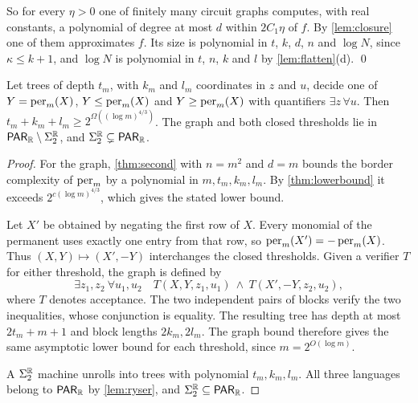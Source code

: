So for every $\eta>0$ one of finitely many circuit graphs computes, with real constants, a polynomial of degree at most $d$ within $2C_1\eta$ of $f$. By \cref{lem:closure} one of them approximates $f$. Its size is polynomial in $t$, $k$, $d$, $n$ and $\log N$, since $\kappa\le k+1$, and $\log N$ is polynomial in $t$, $n$, $k$ and $l$ by \cref{lem:flatten}(d). \qed

\begin{corollary}\label{cor:second}
Let trees of depth $t_m$, with $k_m$ and $l_m$ coordinates in $z$ and $u$, decide one of $Y=\operatorname{per}_m(X)$, $Y\le\operatorname{per}_m(X)$ and $Y\ge\operatorname{per}_m(X)$ with quantifiers $\exists z\,\forall u$. Then $t_m+k_m+l_m\ge2^{\Omega((\log m)^{4/3})}$. The graph and both closed thresholds lie in $\textsf{\upshape PAR}_{\mathbb{R}}\setminus\Sigma_2^{\mathbb{R}}$, and $\Sigma_2^{\mathbb{R}}\subsetneq\textsf{\upshape PAR}_{\mathbb{R}}$.
\end{corollary}

\begin{proof}
For the graph, \cref{thm:second} with $n=m^2$ and $d=m$ bounds the border complexity of $\operatorname{per}_m$ by a polynomial in $m,t_m,k_m,l_m$. By \cref{thm:lowerbound} it exceeds $2^{c(\log m)^{4/3}}$, which gives the stated lower bound.

Let $X'$ be obtained by negating the first row of $X$. Every monomial of the permanent uses exactly one entry from that row, so $\operatorname{per}_m(X')=-\operatorname{per}_m(X)$. Thus $(X,Y)\mapsto(X',-Y)$ interchanges the closed thresholds. Given a verifier $T$ for either threshold, the graph is defined by
\[
\exists z_1,z_2\ \forall u_1,u_2\quad
  T(X,Y,z_1,u_1)\ \land\ T(X',-Y,z_2,u_2),
\]
where $T$ denotes acceptance. The two independent pairs of blocks verify the two inequalities, whose conjunction is equality. The resulting tree has depth at most $2t_m+m+1$ and block lengths $2k_m,2l_m$. The graph bound therefore gives the same asymptotic lower bound for each threshold, since $m=2^{O(\log m)}$.

A $\Sigma_2^{\mathbb{R}}$ machine unrolls into trees with polynomial $t_m,k_m,l_m$. All three languages belong to $\textsf{\upshape PAR}_{\mathbb{R}}$ by \cref{lem:ryser}, and $\Sigma_2^{\mathbb{R}}\subseteq\textsf{\upshape PAR}_{\mathbb{R}}$.
\end{proof}

